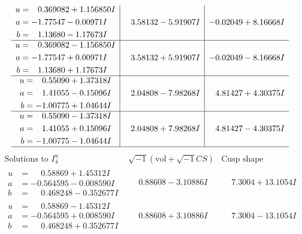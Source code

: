 \documentclass[1p]{elsarticle_modified}
\theoremstyle{definition}
\newcommand{\I}{\sqrt{-1}}
\begin{document}
$$\begin{array}{c|c|c}
\begin{aligned}
u &= \phantom{-}0.369082 + 1.156850 I \\
a &= -1.77547 - 0.00971 I \\
b &= \phantom{-}1.13680 - 1.17673 I\end{aligned}
 & \phantom{-}3.58132 - 5.91907 I & -0.02049 + 8.16668 I \\ \hline\begin{aligned}
u &= \phantom{-}0.369082 - 1.156850 I \\
a &= -1.77547 + 0.00971 I \\
b &= \phantom{-}1.13680 + 1.17673 I\end{aligned}
 & \phantom{-}3.58132 + 5.91907 I & -0.02049 - 8.16668 I \\ \hline\begin{aligned}
u &= \phantom{-}0.55090 + 1.37318 I \\
a &= \phantom{-}1.41055 - 0.15096 I \\
b &= -1.00775 + 1.04644 I\end{aligned}
 & \phantom{-}2.04808 - 7.98268 I & \phantom{-}4.81427 + 4.30375 I \\ \hline\begin{aligned}
u &= \phantom{-}0.55090 - 1.37318 I \\
a &= \phantom{-}1.41055 + 0.15096 I \\
b &= -1.00775 - 1.04644 I\end{aligned}
 & \phantom{-}2.04808 + 7.98268 I & \phantom{-}4.81427 - 4.30375 I\\
 \hline 
 \end{array}$$\newpage$$\begin{array}{c|c|c}  
\text{Solutions to }I^u_{4}& \I (\text{vol} + \sqrt{-1}CS) & \text{Cusp shape}\\
 \hline 
\begin{aligned}
u &= \phantom{-}0.58869 + 1.45312 I \\
a &= -0.564595 - 0.008590 I \\
b &= \phantom{-}0.468248 - 0.352677 I\end{aligned}
 & \phantom{-}0.88608 - 3.10886 I & \phantom{-}7.3004 + 13.1054 I \\ \hline\begin{aligned}
u &= \phantom{-}0.58869 - 1.45312 I \\
a &= -0.564595 + 0.008590 I \\
b &= \phantom{-}0.468248 + 0.352677 I\end{aligned}
 & \phantom{-}0.88608 + 3.10886 I & \phantom{-}7.3004 - 13.1054 I \\ \hline\begin{aligned}

\end{aligned}
\end{array}$$
\end{document}
